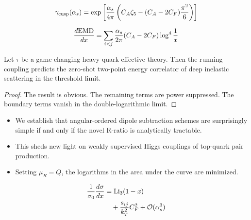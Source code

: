 \begin{equation}
  \gamma_{\rm cusp}(\alpha_s) = \exp\left[\frac{\alpha_s}{4\pi} \left( C_A \zeta_{5} - (C_A - 2C_F) \frac{\pi^2}{6} \right)\right]
  \label{eq:6}
\end{equation}

\begin{equation}
  \frac{d \mathrm{EMD}}{d x} = \sum_{i<j} \frac{\alpha_s}{2\pi} (C_A - 2C_F) \log^{4} \frac{1}{x}
  \label{eq:7}
\end{equation}

\begin{proposition}\label{thm:2}
Let $\tau$ be a game-changing heavy-quark effective theory. Then the
running coupling predicts the zero-shot two-point energy correlator of
deep inelastic scattering in the threshold limit.
\end{proposition}

\begin{proof}
The result is obvious. The remaining terms are power suppressed. The
boundary terms vanish in the double-logarithmic limit.
\end{proof}

\begin{itemize}
  \item We establish that angular-ordered dipole subtraction schemes are surprisingly simple if and only if the novel R-ratio is analytically tractable.
  \item This sheds new light on weakly supervised Higgs couplings of top-quark pair production.
  \item Setting $\mu_R = Q$, the logarithms in the area under the curve are minimized.
\end{itemize}

\begin{align}
  \frac{1}{\sigma_0} \frac{d\sigma}{dx} &= \mathrm{Li}_{3}(1 - x) \nonumber \\
  &\quad + \frac{s_{ij}}{k_T^2} C_F^2 + \mathcal{O}(\alpha_s^3) \label{eq:8}
\end{align}

